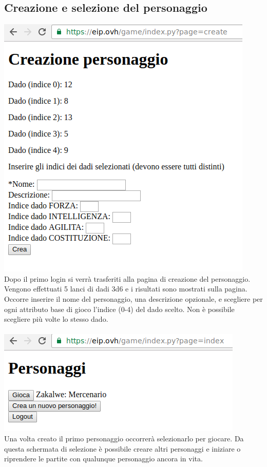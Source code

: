 \documentclass[10pt,a4paper]{article}
\begin{document}
\subsection{Creazione e selezione del personaggio}
\includegraphics[scale=0.7]{3creazionepersonaggio}\\
Dopo il primo login si verrà trasferiti alla pagina di creazione del personaggio. Vengono effettuati 5 lanci di dadi 3d6 e i risultati sono mostrati sulla pagina. Occorre inserire il nome del personaggio, una descrizione opzionale, e scegliere per ogni attributo base di gioco l'indice (0-4) del dado scelto. Non è possibile scegliere più volte lo stesso dado.\\
\\
\includegraphics[scale=0.7]{4selezionepersonaggio}\\
Una volta creato il primo personaggio occorrerà selezionarlo per giocare. Da questa schermata di selezione è possibile creare altri personaggi e iniziare o riprendere le partite con qualunque personaggio ancora in vita.
\end{document}
